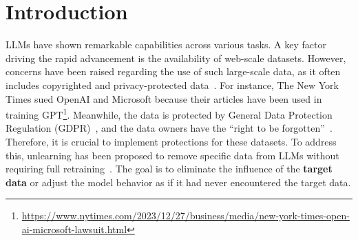 \section{Introduction}
\label{sec:intro}

LLMs have shown remarkable capabilities across various tasks. A key factor driving the rapid advancement is the availability of web-scale datasets. However, concerns have been raised regarding the use of such large-scale data, as it often includes copyrighted and privacy-protected data~\cite{hacker2023regulating, lucchi2024chatgpt}. 
{For instance, The New York Times sued OpenAI and Microsoft because their articles have been used in training GPT\footnote{\href{https://www.nytimes.com/2023/12/27/business/media/new-york-times-open-ai-microsoft-lawsuit.html}{https://www.nytimes.com/2023/12/27/business/media/new-york-times-open-ai-microsoft-lawsuit.html}}.}
{Meanwhile, the data is protected by General Data Protection Regulation (GDPR)~\cite{voigt2017eu}, and the data owners have the ``right to be forgotten''~\cite{rosen2011right}.}
Therefore, it is crucial to implement protections for these datasets. To address this, unlearning has been proposed to remove specific data from LLMs without requiring full retraining~\cite{liu2024large, liu2024rethinking}. The goal is to eliminate the influence of the \textbf{target data} or adjust the model behavior as if it had never encountered the target data.

